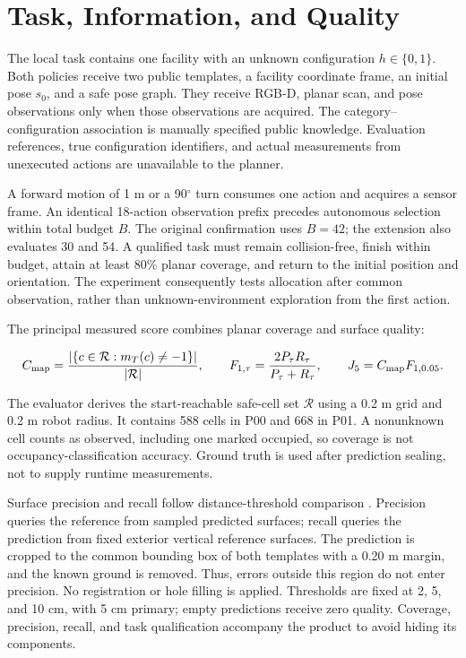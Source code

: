 \documentclass[pdflatex,sn-mathphys-num]{sn-jnl}
\begin{document}
\hypertarget{task-information-and-quality}{%
\section{Task, Information, and Quality}\label{task-information-and-quality}}

The local task contains one facility with an unknown configuration \(h\in\{0,1\}\). Both policies receive two public templates, a facility coordinate frame, an initial pose \(s_0\), and a safe pose graph. They receive RGB-D, planar scan, and pose observations only when those observations are acquired. The category--configuration association is manually specified public knowledge. Evaluation references, true configuration identifiers, and actual measurements from unexecuted actions are unavailable to the planner.

A forward motion of 1 m or a 90\ensuremath{^{\circ}} turn consumes one action and acquires a sensor frame. An identical 18-action observation prefix precedes autonomous selection within total budget \(B\). The original confirmation uses \(B=42\); the extension also evaluates 30 and 54. A qualified task must remain collision-free, finish within budget, attain at least 80\% planar coverage, and return to the initial position and orientation. The experiment consequently tests allocation after common observation, rather than unknown-environment exploration from the first action.

The principal measured score combines planar coverage and surface quality:

\[
C_{\rm map}=\frac{|\{c\in\mathcal R:m_T(c)\ne-1\}|}{|\mathcal R|},
\qquad F_{1,\tau}=\frac{2P_\tau R_\tau}{P_\tau+R_\tau},
\qquad J_5=C_{\rm map}F_{1,0.05}.
\]

The evaluator derives the start-reachable safe-cell set \(\mathcal R\) using a 0.2 m grid and 0.2 m robot radius. It contains 588 cells in P00 and 668 in P01. A nonunknown cell counts as observed, including one marked occupied, so coverage is not occupancy-classification accuracy. Ground truth is used after prediction sealing, not to supply runtime measurements.

Surface precision and recall follow distance-threshold comparison \cite{ref14}. Precision queries the reference from sampled predicted surfaces; recall queries the prediction from fixed exterior vertical reference surfaces. The prediction is cropped to the common bounding box of both templates with a 0.20 m margin, and the known ground is removed. Thus, errors outside this region do not enter precision. No registration or hole filling is applied. Thresholds are fixed at 2, 5, and 10 cm, with 5 cm primary; empty predictions receive zero quality. Coverage, precision, recall, and task qualification accompany the product to avoid hiding its components.
\end{document}
